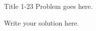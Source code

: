 
\begin{problem}{Title 1-23}
    Problem goes here.
\end{problem}

\begin{solution}
    Write your solution here.
\end{solution}
